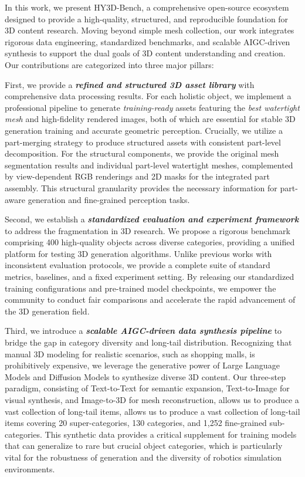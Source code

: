 \documentclass{article} %
\newcommand{\shortname}{HY3D-Bench\xspace}
\begin{document}
In this work, we present \shortname, a comprehensive open-source ecosystem designed to provide a high-quality, structured, and reproducible foundation for 3D content research. Moving beyond simple mesh collection, our work integrates rigorous data engineering, standardized benchmarks, and scalable AIGC-driven synthesis to support the dual goals of 3D content understanding and creation. Our contributions are categorized into three major pillars:

First, we provide a \textbf{\textit{refined and structured 3D asset library}} with comprehensive data processing results. For each holistic object, we implement a professional pipeline to generate \textit{training-ready} assets featuring the \textit{best watertight mesh} and high-fidelity rendered images, both of which are essential for stable 3D generation training and accurate geometric perception. Crucially, we utilize a part-merging strategy to produce structured assets with consistent part-level decomposition. For the structural components, we provide the original mesh segmentation results and individual part-level watertight meshes, complemented by view-dependent RGB renderings and 2D masks for the integrated part assembly. This structural granularity provides the necessary information for part-aware generation and fine-grained perception tasks.

Second, we establish a \textbf{\textit{standardized evaluation and experiment framework}} to address the fragmentation in 3D research. We propose a rigorous benchmark comprising 400 high-quality objects across diverse categories, providing a unified platform for testing 3D generation algorithms. Unlike previous works with inconsistent evaluation protocols, we provide a complete suite of standard metrics, baselines, and a fixed experiment setting. By releasing our standardized training configurations and pre-trained model checkpoints, we empower the community to conduct fair comparisons and accelerate the rapid advancement of the 3D generation field.

Third, we introduce a \textbf{\textit{scalable AIGC-driven data synthesis pipeline}} to bridge the gap in category diversity and long-tail distribution. Recognizing that manual 3D modeling for realistic scenarios, such as shopping malls, is prohibitively expensive, we leverage the generative power of Large Language Models and Diffusion Models to synthesize diverse 3D content. Our three-step paradigm, consisting of Text-to-Text for semantic expansion, Text-to-Image for visual synthesis, and Image-to-3D for mesh reconstruction, allows us to produce a vast collection of long-tail items, allows us to produce a vast collection of long-tail items covering 20 super-categories, 130 categories, and 1,252 fine-grained sub-categories. This synthetic data provides a critical supplement for training models that can generalize to rare but crucial object categories, which is particularly vital for the robustness of generation and the diversity of robotics simulation environments.
\end{document}
